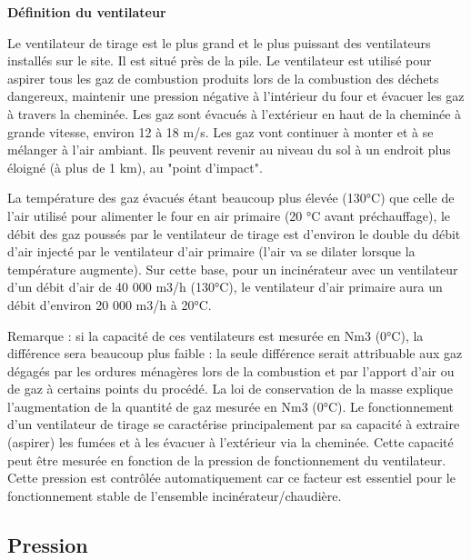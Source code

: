 \textbf{Définition du ventilateur}
\vspace{0.3cm}

Le ventilateur de tirage est le plus grand et le plus puissant des ventilateurs installés sur le site. Il est situé près de la pile. Le ventilateur est utilisé pour aspirer tous les gaz de combustion produits lors de la combustion des déchets dangereux, maintenir une pression négative à l'intérieur du four et évacuer les gaz à travers la cheminée.
Les gaz sont évacués à l'extérieur en haut de la cheminée à grande vitesse, environ 12 à 18 m/s. Les gaz vont continuer à monter et à se mélanger à l'air ambiant. Ils peuvent revenir au niveau du sol à un endroit plus éloigné (à plus de 1 km), au "point d'impact".

\vspace{0.3cm}
La température des gaz évacués étant beaucoup plus élevée (130°C) que celle de l'air utilisé pour alimenter le four en air primaire (20 °C avant préchauffage), le débit des gaz poussés par le ventilateur de tirage est d'environ le double du débit d'air injecté par le ventilateur d'air primaire (l'air va se dilater lorsque la température augmente). Sur cette base, pour un incinérateur avec un ventilateur d'un débit d'air de 40 000 m3/h (130°C), le ventilateur d'air primaire aura un débit d'environ 20 000 m3/h à 20°C.

\vspace{0.3cm}
Remarque : si la capacité de ces ventilateurs est mesurée en Nm3 (0°C), la différence sera beaucoup plus faible : la seule différence serait attribuable aux gaz dégagés par les ordures ménagères lors de la combustion et par l'apport d'air ou de gaz à certains points du procédé. La loi de conservation de la masse explique l'augmentation de la quantité de gaz mesurée en Nm3 (0°C).
\vspace{0.3cm}
Le fonctionnement d'un ventilateur de tirage se caractérise principalement par sa capacité à extraire (aspirer) les fumées et à les évacuer à l'extérieur via la cheminée. Cette capacité peut être mesurée en fonction de la pression de fonctionnement du ventilateur. Cette pression est contrôlée automatiquement car ce facteur est essentiel pour le fonctionnement stable de l'ensemble incinérateur/chaudière.


\subsection{Pression}



